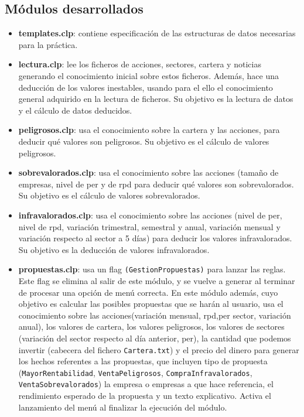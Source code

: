 \documentclass[a4paper,11pt]{article}
\begin{document}
\subsection{Módulos desarrollados}

\begin{itemize}
 \item \textbf{templates.clp}: contiene especificación de las estructuras de datos necesarias para la práctica.
 
 \item \textbf{lectura.clp}: lee los ficheros de acciones, sectores, cartera y noticias generando el conocimiento inicial sobre
 estos ficheros. Además, hace una deducción de los valores inestables, usando para el ello el conocimiento general adquirido
 en la lectura de ficheros. Su objetivo es la lectura de datos y el cálculo de datos deducidos.
 
 \item \textbf{peligrosos.clp}: usa el conocimiento sobre la cartera y las acciones, para deducir qué valores son peligrosos.
 Su objetivo es el cálculo de valores peligrosos.
 
 \item \textbf{sobrevalorados.clp}: usa el conocimiento sobre las acciones (tamaño de empresas, nivel de per y de rpd para
 deducir qué valores son sobrevalorados. Su objetivo es el cálculo de valores sobrevalorados.
 
 \item \textbf{infravalorados.clp}: usa el conocimiento sobre las acciones (nivel de per, nivel de rpd, variación trimestral,
 semestral y anual, variación mensual y variación respecto al sector a 5 días) para deducir los valores infravalorados.
 Su objetivo es la deducción de valores infravalorados.
 
 \item \textbf{propuestas.clp}: usa un flag \texttt{(GestionPropuestas)} para lanzar las reglas. Este flag se elimina al salir
 de este módulo, y se vuelve a generar al terminar de procesar una opción de menú correcta. En este módulo además, cuyo objetivo
 es calcular las posibles propuestas que se harán al usuario, usa el conocimiento sobre las acciones(variación mensual, rpd,per
 sector, variación anual), los valores de cartera,
 los valores peligrosos, los valores de sectores (variación del sector respecto al día anterior, per), la cantidad que podemos 
 invertir (cabecera del fichero \texttt{Cartera.txt}) y el precio del dinero para generar los hechos referentes a las propuestas,
 que incluyen tipo de propuesta (\texttt{MayorRentabilidad}, \texttt{VentaPeligrosos}, \texttt{CompraInfravalorados}, 
 \texttt{VentaSobrevalorados}) la empresa o empresas a que hace referencia, el rendimiento esperado de la propuesta y un texto
 explicativo. Activa el lanzamiento del menú al finalizar la ejecución del módulo.
 

\end{itemize}
\end{document}
